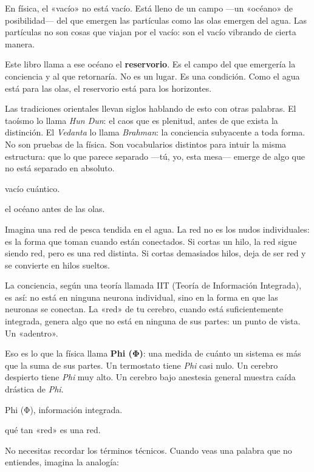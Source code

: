 En física, el «vacío» no está vacío. Está lleno de un campo —un «océano» de posibilidad— del que emergen las partículas como las olas emergen del agua. Las partículas no son cosas que viajan por el vacío: son el vacío vibrando de cierta manera.

Este libro llama a ese océano el \textbf{reservorio}. Es el campo del que emergería la conciencia y al que retornaría. No es un lugar. Es una condición. Como el agua está para las olas, el reservorio está para los horizontes.

Las tradiciones orientales llevan siglos hablando de esto con otras palabras. El taoísmo lo llama \emph{Hun Dun}: el caos que es plenitud, antes de que exista la distinción. El \emph{Vedanta} lo llama \emph{Brahman}: la conciencia subyacente a toda forma. No son pruebas de la física. Son vocabularios distintos para intuir la misma estructura: que lo que parece separado —tú, yo, esta mesa— emerge de algo que no está separado en absoluto.

\begin{fisica}
 vacío cuántico.

 el océano antes de las olas.
\end{fisica}
\noindent Imagina una red de pesca tendida en el agua. La red no es los nudos individuales: es la forma que toman cuando están conectados. Si cortas un hilo, la red sigue siendo red, pero es una red distinta. Si cortas demasiados hilos, deja de ser red y se convierte en hilos sueltos.

La conciencia, según una teoría llamada IIT (Teoría de Información Integrada), es así: no está en ninguna neurona individual, sino en la forma en que las neuronas se conectan. La «red» de tu cerebro, cuando está suficientemente integrada, genera algo que no está en ninguna de sus partes: un punto de vista. Un «adentro».

Eso es lo que la física llama \textbf{Phi (Φ)}: una medida de cuánto un sistema es más que la suma de sus partes. Un termostato tiene \emph{Phi} casi nulo. Un cerebro despierto tiene \emph{Phi} muy alto. Un cerebro bajo anestesia general muestra caída drástica de \emph{Phi}.

\begin{fisica}
 Phi (Φ), información integrada.

 qué tan «red» es una red.
\end{fisica}
\noindent No necesitas recordar los términos técnicos. Cuando veas una palabra que no entiendes, imagina la analogía:

